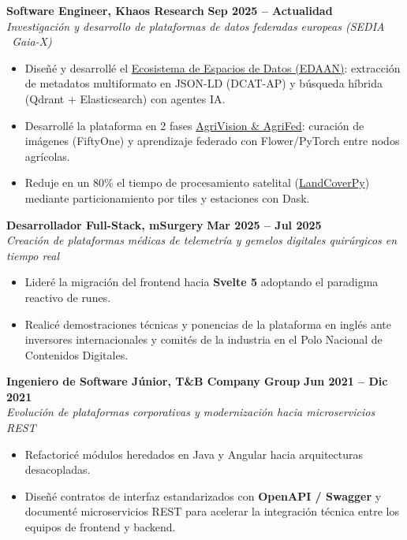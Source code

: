\documentclass[a4paper,10pt]{article}
\begin{document}
\noindent\textbf{Software Engineer, Khaos Research} \hfill {\footnotesize\color{subtext}\textbf{Sep 2025 -- Actualidad}} \\
{\footnotesize\color{subtext}\textit{Investigación y desarrollo de plataformas de datos federadas europeas (SEDIA \textbar\ Gaia-X)}}
\begin{itemize}
  \item Diseñé y desarrollé el \href{https://diegodepablo.is-a.dev/projects/edaan-data-space}{Ecosistema de Espacios de Datos (EDAAN)}: extracción de metadatos multiformato en JSON-LD (DCAT-AP) y búsqueda híbrida (Qdrant + Elasticsearch) con agentes IA.
  \item Desarrollé la plataforma en 2 fases \href{https://diegodepablo.is-a.dev/projects/agrivision-agrifed}{AgriVision \& AgriFed}: curación de imágenes (FiftyOne) y aprendizaje federado con Flower/PyTorch entre nodos agrícolas.
  \item Reduje en un 80\% el tiempo de procesamiento satelital (\href{https://diegodepablo.is-a.dev/projects/landcoverpy}{LandCoverPy}) mediante particionamiento por tiles y estaciones con Dask.
\end{itemize}

\vspace{5pt}

\noindent\textbf{Desarrollador Full-Stack, mSurgery} \hfill {\footnotesize\color{subtext}\textbf{Mar 2025 -- Jul 2025}} \\
{\footnotesize\color{subtext}\textit{Creación de plataformas médicas de telemetría y gemelos digitales quirúrgicos en tiempo real}}
\begin{itemize}
  \item Lideré la migración del frontend hacia \textbf{Svelte 5} adoptando el paradigma reactivo de runes.
  \item Realicé demostraciones técnicas y ponencias de la plataforma en inglés ante inversores internacionales y comités de la industria en el Polo Nacional de Contenidos Digitales.
\end{itemize}

\vspace{5pt}

\noindent\textbf{Ingeniero de Software Júnior, T\&B Company Group} \hfill {\footnotesize\color{subtext}\textbf{Jun 2021 -- Dic 2021}} \\
{\footnotesize\color{subtext}\textit{Evolución de plataformas corporativas y modernización hacia microservicios REST}}
\begin{itemize}
  \item Refactoricé módulos heredados en Java y Angular hacia arquitecturas desacopladas.
  \item Diseñé contratos de interfaz estandarizados con \textbf{OpenAPI / Swagger} y documenté microservicios REST para acelerar la integración técnica entre los equipos de frontend y backend.
\end{itemize}
\end{document}

